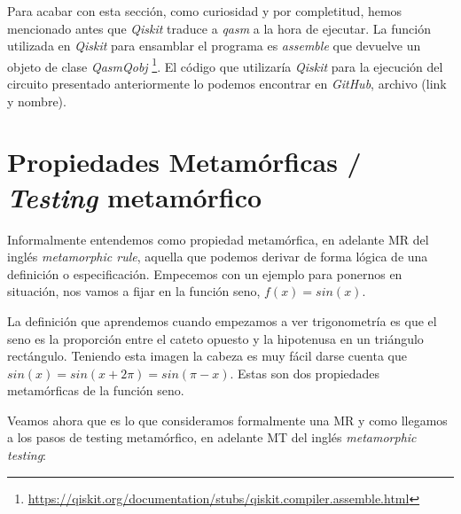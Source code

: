 Para acabar con esta sección, como curiosidad y por completitud, hemos mencionado antes que \textit{Qiskit} traduce a \textit{qasm} a la hora de ejecutar. La función utilizada en \textit{Qiskit} para ensamblar el programa es \textit{assemble} que devuelve un objeto de clase \textit{QasmQobj} \footnote{\url{https://qiskit.org/documentation/stubs/qiskit.compiler.assemble.html}}. El código que utilizaría \textit{Qiskit} para la ejecución del circuito presentado anteriormente lo podemos encontrar en \textit{GitHub}, archivo (link y nombre).\newline


\vspace{10pt}

\section{Propiedades Metamórficas / \textit{Testing} metamórfico}
\label{Sec2.4:Metamorfico}

Informalmente entendemos como propiedad metamórfica, en adelante MR del inglés \textit{metamorphic rule}, aquella que podemos derivar de forma lógica de una definición o especificación. Empecemos con un ejemplo para ponernos en situación, nos vamos a fijar en la función seno, $f(x)=sin(x)$.\newline

La definición que aprendemos cuando empezamos a ver trigonometría es que el seno es la proporción entre el cateto opuesto y la hipotenusa en un triángulo rectángulo. Teniendo esta imagen la cabeza es muy fácil darse cuenta que $sin(x)=sin(x + 2\pi)=sin(\pi-x)$. Estas son dos propiedades metamórficas de la función seno. \newline

Veamos ahora que es lo que consideramos formalmente una MR y como llegamos a los pasos de testing metamórfico, en adelante MT del inglés \textit{metamorphic testing}\cite{AR:MTmain:2008}:\newline

